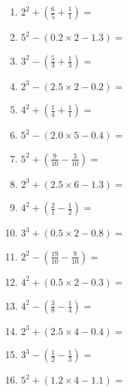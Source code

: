 \documentclass[12pt]{article}
\begin{document}
\begin{enumerate}
\item \large $ 2^{2} + (\frac{6}{5} + \frac{1}{1}) = $ \vspace{1.6cm}
\item \large $ 5^{2} - (0.2 \times 2 - 1.3) = $ \vspace{1.6cm}
\item \large $ 3^{2} - (\frac{5}{3} + \frac{1}{3}) = $ \vspace{1.6cm}
\item \large $ 2^{3} - (2.5 \times 2 - 0.2) = $ \vspace{1.6cm}
\item \large $ 4^{2} + (\frac{1}{4} + \frac{1}{1}) = $ \vspace{1.6cm}
\item \large $ 5^{2} - (2.0 \times 5 - 0.4) = $ \vspace{1.6cm}
\newpage
\item \large $ 5^{2} + (\frac{9}{10} - \frac{3}{10}) = $ \vspace{1.6cm}
\item \large $ 2^{3} + (2.5 \times 6 - 1.3) = $ \vspace{1.6cm}
\item \large $ 4^{2} + (\frac{2}{1} - \frac{1}{2}) = $ \vspace{1.6cm}
\item \large $ 3^{3} + (0.5 \times 2 - 0.8) = $ \vspace{1.6cm}
\item \large $ 2^{2} - (\frac{19}{10} - \frac{9}{10}) = $ \vspace{1.6cm}
\item \large $ 4^{2} + (0.5 \times 2 - 0.3) = $ \vspace{1.6cm}
\item \large $ 4^{2} - (\frac{3}{8} - \frac{1}{4}) = $ \vspace{1.6cm}
\item \large $ 2^{3} + (2.5 \times 4 - 0.4) = $ \vspace{1.6cm}
\item \large $ 3^{3} - (\frac{1}{2} - \frac{1}{3}) = $ \vspace{1.6cm}
\item \large $ 5^{2} + (1.2 \times 4 - 1.1) = $ \vspace{1.6cm}
\end{enumerate}\newpage
\end{document}
